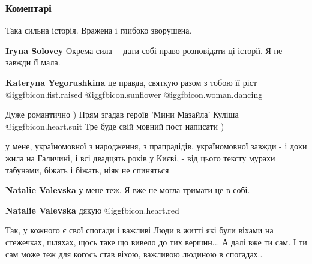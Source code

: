  
 
 
 
 
\subsubsection{Коментарі}
\label{sec:14_09_2021.fb.jegorushkina_katerina.1.mova_osobyste.cmt}

\begin{itemize} %
Така сильна історія. Вражена і глибоко зворушена.

\begin{itemize} %
\textbf{Iryna Solovey} Окрема сила —дати собі право розповідати ці історії. Я не завжди її мала.

\textbf{Kateryna Yegorushkina} це правда, святкую разом з тобою її ріст 
@igg{fbicon.fist.raised}  @igg{fbicon.sunflower}  @igg{fbicon.woman.dancing} 
\end{itemize} %


Дуже романтично ) Прям згадав героїв 'Мини Мазайла' Куліша @igg{fbicon.heart.suit} Тре буде свій мовний пост написати )


у мене, україномовної з народження, з прапрадідів, україномовної завжди - і
доки жила на Галичині, і всі двадцять років у Києві, - від цього тексту мурахи
табунами, біжать і біжать, ніяк не спиняться

\begin{itemize} %
\textbf{Natalie Valevska} у мене теж. Я вже не могла тримати це в собі.

\textbf{Natalie Valevska} дякую @igg{fbicon.heart.red}
\end{itemize} %


Так, у кожного є свої спогади і важливі Люди в житті які були віхами на
стежечках, шляхах, щось таке що вивело до тих вершин... А далі вже ти сам. І ти
сам може теж для когось став віхою, важливою людиною в спогадах..


\end{itemize}
